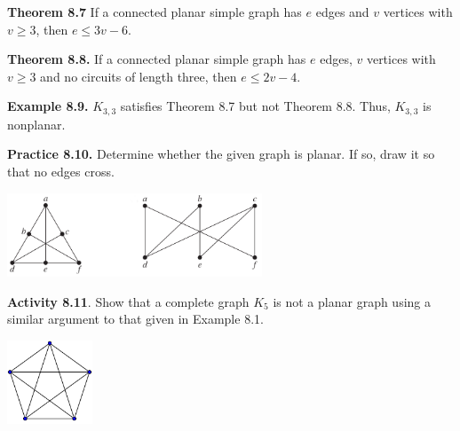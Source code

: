 \documentclass[aspectratio=169]{beamer}
\begin{document}
\begin{frame}[plain]{}

 {\bf Theorem 8.7}  If a connected planar simple graph has  $e$ edges 
 and $v$ vertices with $v\geq 3$, then $e\leq 3v-6$.
 \medskip
 
 {\bf Theorem 8.8.} If a connected planar simple graph has  $e$ edges, 
 $v$ vertices with $v\geq 3$ and no circuits of length three, then $e\leq 2v-4$.
 \medskip
 
 {\bf Example 8.9.}
 $K_{3,3}$ satisfies Theorem 8.7 but not Theorem 8.8. Thus, $K_{3,3}$ is nonplanar.
 \medskip
 
 {\bf Practice 8.10.}  Determine whether the given graph is planar.
 If so, draw it so that no edges cross.
\begin{center}
  \includegraphics[height=2.5cm]{./img/lecture8-fig11.png}
 \end{center}
 
\end{frame}

\begin{frame}[plain]{}
 
 {\bf Activity 8.11}. Show that a complete graph $K_{5}$ is not a planar graph using 
a similar argument to that given in Example 8.1.
 \begin{center}
   \includegraphics[height=2.5cm]{./img/lecture8-fig8.png}
 \end{center}
\vspace{1in}

 
\end{frame}
\end{document}
